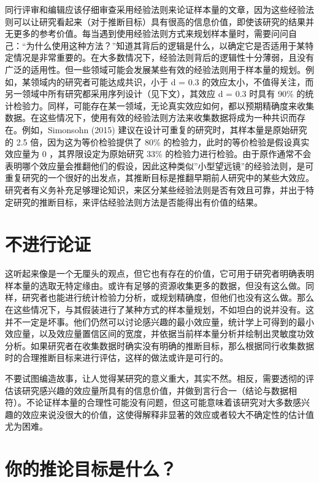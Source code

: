 \documentclass[
  letterpaper,
  DIV=11,
  numbers=noendperiod]{scrreprt}
\begin{document}
同行评审和编辑应该仔细审查采用经验法则来论证样本量的文章，因为这些经验法则可以让研究看起来（对于推断目标）具有很高的信息价值，即使该研究的结果并无更多的参考价值。每当遇到使用经验法则方式来规划样本量时，需要问问自己：``为什么使用这种方法？''知道其背后的逻辑是什么，以确定它是否适用于某特定情况是非常重要的。在大多数情况下，经验法则背后的逻辑性十分薄弱，且没有广泛的适用性。但一些领域可能会发展某些有效的经验法则用于样本量的规划。例如，某领域内的研究者可能达成共识，小于
d = 0.3
的效应太小，不值得关注，而另一领域中所有研究都采用序列设计（见下文），其效应
d = 0.3 时具有 90\%
的统计检验力。同样，可能存在某一领域，无论真实效应如何，都以预期精确度来收集数据。在这些情况下，使用有效的经验法则方法来收集数据将成为一种共识而存在。例如，Simonsohn
(2015) 建议在设计可重复的研究时，其样本量是原始研究的 2.5
倍，因为这为等价检验提供了 80\%
的检验力，此时的等价检验是假设真实效应量为 0 ，其界限设定为原始研究 33\%
的检验力进行检验。由于原作通常不会表明哪个效应量会推翻他们的假设，因此这种类似''小型望远镜''的经验法则，是可重复研究的一个很好的出发点，其推断目标是推翻早期前人研究中的某些大效应。研究者有义务补充足够理论知识，来区分某些经验法则是否有效且可靠，并出于特定研究的推断目标，来评估经验法则方法是否能得出有价值的结果。

\hypertarget{ux4e0dux8fdbux884cux8bbaux8bc1}{%
\section{不进行论证}\label{ux4e0dux8fdbux884cux8bbaux8bc1}}

这听起来像是一个无厘头的观点，但它也有存在的价值，它可用于研究者明确表明样本量的选取无特定缘由。或许有足够的资源收集更多的数据，但没有这么做。同样，研究者也能进行统计检验力分析，或规划精确度，但他们也没有这么做。那么在这些情况下，与其假装进行了某种方式的样本量规划，不如坦白的说并没有。这并不一定是坏事。他们仍然可以讨论感兴趣的最小效应量，统计学上可得到的最小效应量，以及效应量置信区间的宽度，并依据当前样本量分析并绘制出灵敏度功效分析。如果研究者在收集数据时确实没有明确的推断目标，那么根据同行收集数据时的合理推断目标来进行评估，这样的做法或许是可行的。

不要试图编造故事，让人觉得某研究的意义重大，其实不然。相反，需要透彻的评估该研究感兴趣的效应量所具有的信息价值，并做到言行合一（结论与数据相符）。不论证样本量的合理性可能没有问题，但这可能意味着该研究对大多数感兴趣的效应来说没很大的价值，这使得解释非显著的效应或者较大不确定性的估计值尤为困难。

\hypertarget{ux4f60ux7684ux63a8ux8bbaux76eeux6807ux662fux4ec0ux4e48}{%
\section{你的推论目标是什么？}\label{ux4f60ux7684ux63a8ux8bbaux76eeux6807ux662fux4ec0ux4e48}}
\end{document}
